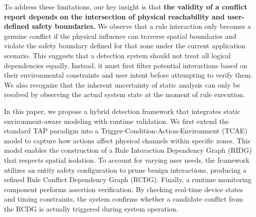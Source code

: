 
To address these limitations, our key insight is that \textbf{the validity of a conflict report depends on the intersection of physical reachability and user-defined safety boundaries.} We observe that a rule interaction only becomes a genuine conflict if the physical influence can traverse spatial boundaries and violate the safety boundary defined for that zone under the current application scenario. This suggests that a detection system should not treat all logical dependencies equally. Instead, it must first filter potential interactions based on their environmental constraints and user intent before attempting to verify them. We also recognize that the inherent uncertainty of static analysis can only be resolved by observing the actual system state at the moment of rule execution.

In this paper, we propose a hybrid detection framework that integrates static environment-aware modeling with runtime validation. We first extend the standard TAP paradigm into a Trigger-Condition-Action-Environment (TCAE) model to capture how actions affect physical channels within specific zones. This model enables the construction of a Rule Interaction Dependency Graph (RIDG) that respects spatial isolation. To account for varying user needs, the framework utilizes an entity safety configuration to prune benign interactions, producing a refined Rule Conflict Dependency Graph (RCDG). Finally, a runtime monitoring component performs assertion verification. By checking real-time device states and timing constraints, the system confirms whether a candidate conflict from the RCDG is actually triggered during system operation.

